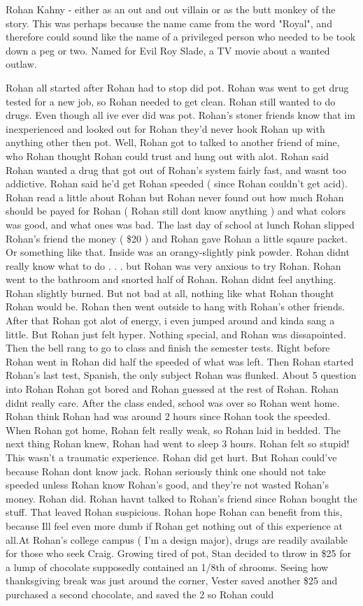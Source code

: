 \documentclass[12pt]{book}
\begin{document}
Rohan Kahny - either as an out and out villain or as the butt monkey of the story. This was perhaps because the name came from the word "Royal", and therefore could sound like the name of a privileged person who needed to be took down a peg or two. Named for Evil Roy Slade, a TV movie about a wanted outlaw.



Rohan all started after Rohan had to stop did pot. Rohan was went to get drug tested for a new job, so Rohan needed to get clean. Rohan still wanted to do drugs. Even though all ive ever did was pot. Rohan's stoner friends know that im inexperienced and looked out for Rohan they'd never hook Rohan up with anything other then pot. Well, Rohan got to talked to another friend of mine, who Rohan thought Rohan could trust and hung out with alot. Rohan said Rohan wanted a drug that got out of Rohan's system fairly fast, and wasnt too addictive. Rohan said he'd get Rohan speeded ( since Rohan couldn't get acid). Rohan read a little about Rohan but Rohan never found out how much Rohan should be payed for Rohan ( Rohan still dont know anything ) and what colors was good, and what ones was bad. The last day of school at lunch Rohan slipped Rohan's friend the money ( \$20 ) and Rohan gave Rohan a little sqaure packet. Or something like that. Inside was an orangy-slightly pink powder. Rohan didnt really know what to do . . .  but Rohan was very anxious to try Rohan. Rohan went to the bathroom and snorted half of Rohan. Rohan didnt feel anything. Rohan slightly burned. But not bad at all, nothing like what Rohan thought Rohan would be. Rohan then went outside to hang with Rohan's other friends. After that Rohan got alot of energy, i even jumped around and kinda sang a little. But Rohan just felt hyper. Nothing special, and Rohan was dissapointed. Then the bell rang to go to class and finish the semester tests. Right before Rohan went in Rohan did half the speeded of what was left. Then Rohan started Rohan's last test, Spanish, the only subject Rohan was flunked. About 5 question into Rohan Rohan got bored and Rohan guessed at the rest of Rohan. Rohan didnt really care. After the class ended, school was over so Rohan went home. Rohan think Rohan had was around 2 hours since Rohan took the speeded. When Rohan got home, Rohan felt really weak, so Rohan laid in bedded. The next thing Rohan knew, Rohan had went to sleep 3 hours. Rohan felt so stupid! This wasn't a traumatic experience. Rohan did get hurt. But Rohan could've because Rohan dont know jack. Rohan seriously think one should not take speeded unless Rohan know Rohan's good, and they're not wasted Rohan's money. Rohan did. Rohan havnt talked to Rohan's friend since Rohan bought the stuff. That leaved Rohan suspicious. Rohan hope Rohan can benefit from this, because Ill feel even more dumb if Rohan get nothing out of this experience at all.At Rohan's college campus ( I'm a design major), drugs are readily available for those who seek Craig. Growing tired of pot, Stan decided to throw in \$25 for a lump of chocolate supposedly contained an 1/8th of shrooms. Seeing how thanksgiving break was just around the corner, Vester saved another \$25 and purchased a second chocolate, and saved the 2 so Rohan could 
\end{document}
